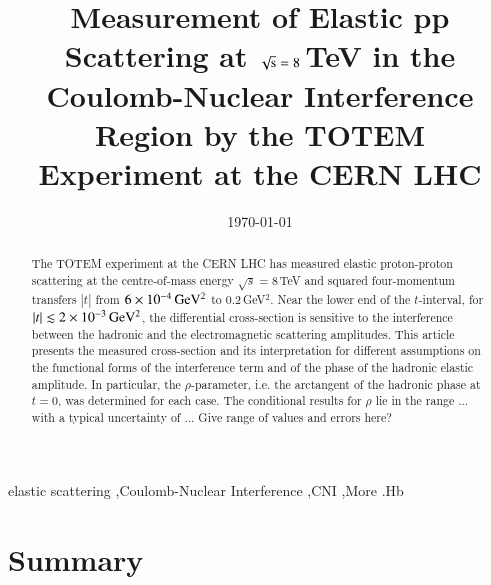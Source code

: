 \documentclass[3p,twocolumn,a4paper]{elsarticle}
\def\todo#1{{\color{red} #1}}
\begin{document}
\begin{frontmatter}

\title{Measurement of Elastic pp Scattering at $\sqrt{\hbox{s}} = \hbox{8}$\,TeV in the 
Coulomb-Nuclear Interference Region by the TOTEM Experiment at the CERN LHC}



\date{\today}

\begin{abstract}
The TOTEM experiment at the CERN LHC has measured elastic proton-proton 
scattering at the centre-of-mass energy 
$\sqrt{s}=8\,$TeV and squared four-momentum transfers $|t|$ from $6\times10^{-4}\,\rm GeV^{2}$ to 0.2\,GeV$^{2}$.
Near the lower end of the $t$-interval, for
$|t| \lesssim 2\times10^{-3}\,\rm GeV^{2}$, the differential cross-section is 
sensitive to the 
interference between the hadronic and the electromagnetic scattering amplitudes.
This article presents the measured cross-section and its interpretation for 
different assumptions on the functional forms of the interference term and of 
the phase of the hadronic elastic amplitude. In 
particular, the $\rho$-parameter, i.e. 
the arctangent of the hadronic phase at $t = 0$,
was determined for each case. The conditional results for $\rho$ lie in the 
range ... with a typical uncertainty of ...
\todo{Give range of values and errors here?}
\end{abstract}

\begin{keyword}
elastic scattering \sep Coulomb-Nuclear Interference \sep CNI \sep More
.Hb %
\end{keyword}
\end{frontmatter}















\section{Summary}
\end{document}
